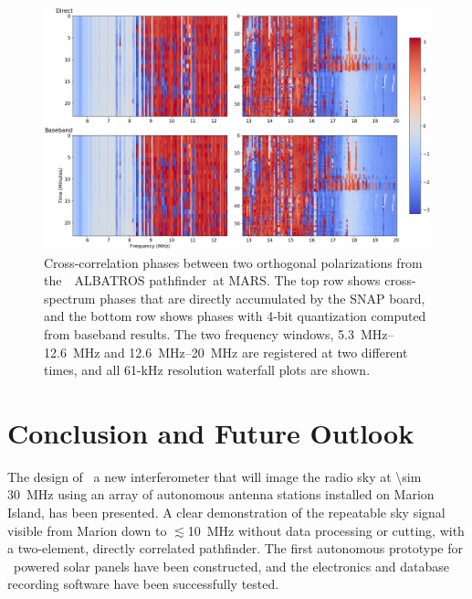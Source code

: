 \begin{figure}
	\centering
	\includegraphics[width=\linewidth]{"Figures/cross mars"}
	\caption{Cross-correlation phases between two orthogonal polarizations from the  ALBATROS pathfinder at MARS. The top row shows cross-spectrum phases that are directly accumulated by the SNAP board, and the bottom row shows phases with 4-bit quantization computed from baseband results. The two frequency windows, \SIrange{5.3}{12.6}{\mega \hertz} and \SIrange{12.6}{20}{\mega \hertz} are registered at two different times, and all 61-kHz resolution waterfall plots are shown.}
	\label{Fig:crossmars}
\end{figure}

\section{Conclusion and Future Outlook}

The design of \albatros\, a new interferometer that will image the radio sky at \SI{\sim 30}{\mega \hertz} using an array of autonomous antenna stations installed on Marion Island, has been presented. A clear demonstration of the repeatable sky signal visible from Marion down to $\lesssim$10~MHz without data processing or cutting, with a two-element, directly correlated pathfinder. The first autonomous prototype for \albatros\ powered solar panels have been constructed, and the electronics and database recording software have been successfully tested.

